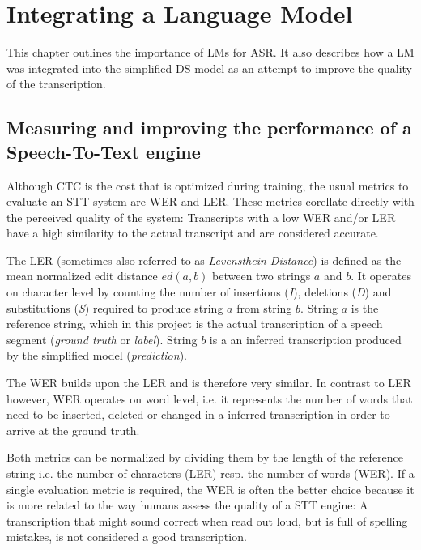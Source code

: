 \section{Integrating a Language Model}\label{lm}

This chapter outlines the importance of \ac{LM}s for \ac{ASR}. It also describes how a \ac{LM} was integrated into the simplified \ac{DS} model as an attempt to improve the quality of the transcription.

\subsection{Measuring and improving the performance of a Speech-To-Text engine}

Although \ac{CTC} is the cost that is optimized during training, the usual metrics to evaluate an \ac{STT} system are \ac{WER} and \ac{LER}. These metrics corellate directly with the perceived quality of the system: Transcripts with a low \ac{WER} and/or \ac{LER} have a high similarity to the actual transcript and are considered accurate.

The \ac{LER} (sometimes also referred to as \textit{Levensthein Distance}) is defined as the mean normalized edit distance $ed(a, b)$ between two strings $a$ and $b$. It operates on character level by counting the number of insertions (\textit{I}), deletions (\textit{D}) and substitutions (\textit{S}) required to produce string $a$ from string $b$. String $a$ is the reference string, which in this project is the actual transcription of a speech segment (\textit{ground truth} or \textit{label}). String $b$ is a an inferred transcription produced by the simplified model (\textit{prediction}).  

The \ac{WER} builds upon the \ac{LER} and is therefore very similar. In contrast to \ac{LER} however, \ac{WER} operates on word level, i.e. it represents the number of words that need to be inserted, deleted or changed in a inferred transcription in order to arrive at the ground truth.

Both metrics can be normalized by dividing them by the length of the reference string i.e. the number of characters (\ac{LER}) resp. the number of words (\ac{WER}). If a single evaluation metric is required, the \ac{WER} is often the better choice because it is more related to the way humans assess the quality of a \ac{STT} engine: A transcription that might sound correct when read out loud, but is full of spelling mistakes, is not considered a good transcription. 

